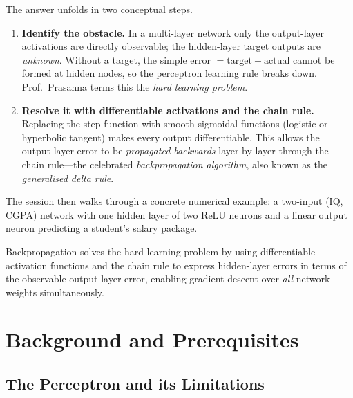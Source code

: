 \documentclass[12pt,a4paper]{article}
\begin{document}
The answer unfolds in two conceptual steps.
\begin{enumerate}[label=\textbf{Step \arabic*.},leftmargin=3em]
  \item \textbf{Identify the obstacle.}  In a multi-layer network only the
    output-layer activations are directly observable; the hidden-layer target
    outputs are \emph{unknown}.  Without a target, the simple
    error $= \text{target} - \text{actual}$ cannot be formed at hidden nodes,
    so the perceptron learning rule breaks down.  Prof.~Prasanna terms this
    the \emph{hard learning problem}.

  \item \textbf{Resolve it with differentiable activations and the chain
    rule.}  Replacing the step function with smooth sigmoidal functions
    (logistic or hyperbolic tangent) makes every output differentiable.  This
    allows the output-layer error to be \emph{propagated backwards} layer by
    layer through the chain rule---the celebrated
    \emph{backpropagation algorithm}, also known as the
    \emph{generalised delta rule}.
\end{enumerate}

The session then walks through a concrete numerical example: a two-input
(IQ, CGPA) network with one hidden layer of two ReLU neurons and a linear
output neuron predicting a student's salary package.

\begin{keyinsight}[title=Session~05 in One Sentence]
  Backpropagation solves the hard learning problem by using differentiable
  activation functions and the chain rule to express hidden-layer errors in
  terms of the observable output-layer error, enabling gradient descent over
  \emph{all} network weights simultaneously.
\end{keyinsight}

\section{Background and Prerequisites}
\label{sec:background}

\subsection{The Perceptron and its Limitations}
\label{subsec:perceptron}
\end{document}
